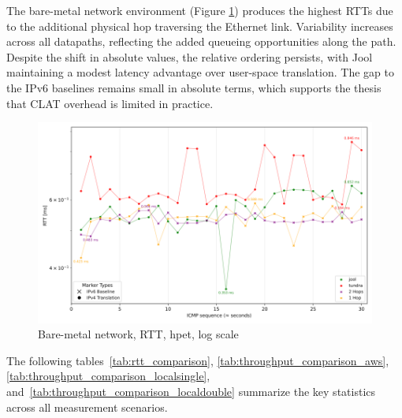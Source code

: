The bare-metal network environment (Figure \ref{fig:Dual_icmp_sameScale_hpet_log}) produces the highest RTTs due to the additional physical hop traversing the Ethernet link. Variability increases across all datapaths, reflecting the added queueing opportunities along the path. Despite the shift in absolute values, the relative ordering persists, with Jool maintaining a modest latency advantage over user-space translation. The gap to the IPv6 baselines remains small in absolute terms, which supports the thesis that CLAT overhead is limited in practice.


\begin{figure}[H]
    \centering
    \includegraphics[width=1\textwidth]{resources/plots/CombinedPlot/RTT/Double_ping_rtt_Ping_30s_log.png}
    \caption{Bare-metal network, RTT, hpet, log scale}
    \label{fig:Dual_icmp_sameScale_hpet_log}
\end{figure}

The following tables~\ref{tab:rtt_comparison}, \ref{tab:throughput_comparison_aws}, \ref{tab:throughput_comparison_localsingle}, and~\ref{tab:throughput_comparison_localdouble} summarize the key statistics across all measurement scenarios.

